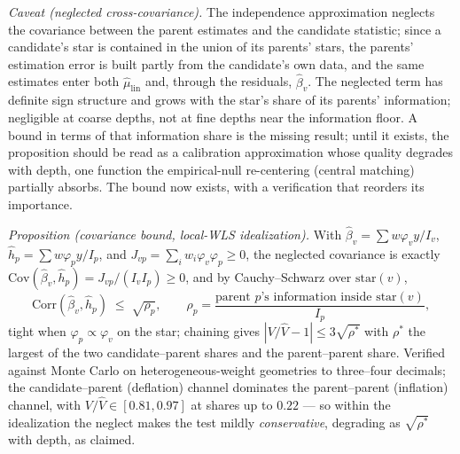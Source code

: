 \documentclass[11pt]{article}
\begin{document}
\emph{Caveat (neglected cross-covariance).} The independence approximation
neglects the covariance between the parent estimates and the candidate
statistic; since a candidate's star is contained in the union of its parents'
stars, the parents' estimation error is built partly from the candidate's own
data, and the same estimates enter both $\hat\mu_{\mathrm{lin}}$ and, through
the residuals, $\hat\beta_v$. The neglected term has definite sign structure
and grows with the star's share of its parents' information; negligible at
coarse depths, not at fine depths near the information floor. A bound in
terms of that information share is the missing result; until it exists, the
proposition should be read as a calibration approximation whose quality
degrades with depth, one function the empirical-null re-centering (central
matching) partially absorbs. The bound now exists, with a verification that
reorders its importance.

\emph{Proposition (covariance bound, local-WLS idealization).} With
$\hat\beta_v=\sum w\varphi_v y/I_v$, $\hat h_p=\sum w\varphi_p y/I_p$, and
$J_{vp}=\sum_i w_i\varphi_v\varphi_p\ge0$, the neglected covariance is
exactly $\mathrm{Cov}(\hat\beta_v,\hat h_p)=J_{vp}/(I_vI_p)\ge0$, and by
Cauchy--Schwarz over $\mathrm{star}(v)$,
\[
\mathrm{Corr}(\hat\beta_v,\hat h_p)\;\le\;\sqrt{\rho_p},\qquad
\rho_p=\frac{\text{parent $p$'s information inside }\mathrm{star}(v)}{I_p},
\]
tight when $\varphi_p\propto\varphi_v$ on the star; chaining gives
$|V/\hat V-1|\le3\sqrt{\rho^*}$ with $\rho^*$ the largest of the two
candidate--parent shares and the parent--parent share. Verified against
Monte Carlo on heterogeneous-weight geometries to three--four decimals; the
candidate--parent (deflation) channel dominates the parent--parent
(inflation) channel, with $V/\hat V\in[0.81,0.97]$ at shares up to $0.22$
--- so within the idealization the neglect makes the test mildly
\emph{conservative}, degrading as $\sqrt{\rho^*}$ with depth, as claimed.
\end{document}
